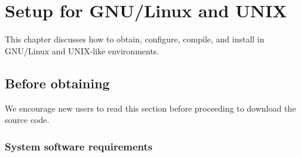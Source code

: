 \chapter{Setup for GNU/Linux and UNIX}
\label{chapter:setup-linux}



This chapter discusses how to obtain, configure, compile, and install
\libflamens in GNU/Linux and UNIX-like environments.



\section{Before obtaining \libflame}

We encourage new users to read this section before proceeding to download
the \libflame source code.

\subsection{System software requirements}


